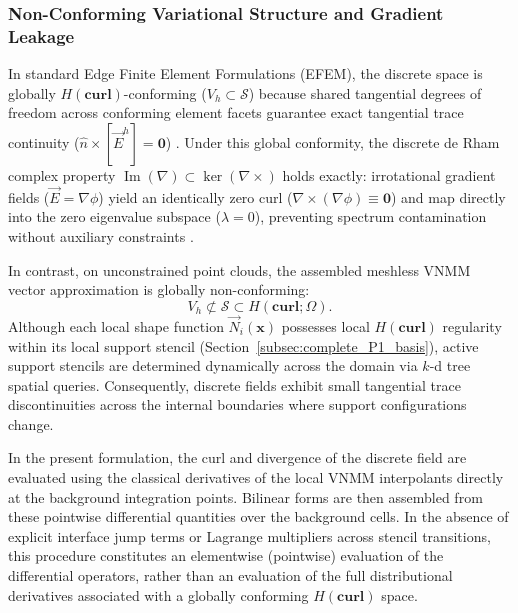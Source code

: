 \documentclass[preprint,12pt]{elsarticle}
\begin{document}
\subsubsection{Non-Conforming Variational Structure and Gradient Leakage}
\label{subsubsec:theoretical_origin_leakage}
In standard Edge Finite Element Formulations (EFEM), the discrete space is globally $H(\mathbf{curl})$-conforming ($V_h \subset \mathcal{S}$) because shared tangential degrees of freedom across conforming element facets guarantee exact tangential trace continuity ($\hat{n} \times [\vec{E}^h] = \mathbf{0}$) \cite{monk2003finite, bossavit1998computational}. Under this global conformity, the discrete de Rham complex property $\operatorname{Im}(\nabla) \subset \ker(\nabla \times)$ holds exactly: irrotational gradient fields ($\vec{E} = \nabla \phi$) yield an identically zero curl ($\nabla \times (\nabla \phi) \equiv \mathbf{0}$) and map directly into the zero eigenvalue subspace ($\lambda = 0$), preventing spectrum contamination without auxiliary constraints \cite{monk2003finite, boffi1999computational, boffi2013mixed}.

In contrast, on unconstrained point clouds, the assembled meshless VNMM vector approximation is globally non-conforming:
\begin{equation}
    V_h \not\subset \mathcal{S} \subset H(\mathbf{curl}; \Omega).
    \label{eq:nonconforming_space}
\end{equation}
Although each local shape function $\vec{N}_i(\mathbf{x})$ possesses local $H(\mathbf{curl})$ regularity within its local support stencil (Section~\ref{subsec:complete_P1_basis}), active support stencils are determined dynamically across the domain via $k$-d tree spatial queries. Consequently, discrete fields exhibit small tangential trace discontinuities across the internal boundaries where support configurations change.

In the present formulation, the curl and divergence of the discrete field are evaluated using the classical derivatives of the local VNMM interpolants directly at the background integration points. Bilinear forms are then assembled from these pointwise differential quantities over the background cells. In the absence of explicit interface jump terms or Lagrange multipliers across stencil transitions, this procedure constitutes an elementwise (pointwise) evaluation of the differential operators, rather than an evaluation of the full distributional derivatives associated with a globally conforming $H(\mathbf{curl})$ space.
\end{document}
